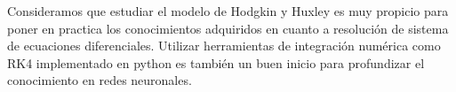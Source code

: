 \documentclass[aps,prl,twocolumn,groupedaddress]{revtex4-2}
\begin{document}
Consideramos que estudiar el modelo de Hodgkin y Huxley es muy propicio para poner en practica los conocimientos adquiridos en cuanto a resolución de sistema de ecuaciones diferenciales. Utilizar herramientas de integración numérica como RK4 implementado en python es también un buen inicio para profundizar el conocimiento en redes neuronales.

 \\



%



%
\end{document}
